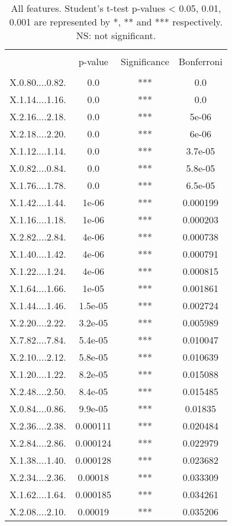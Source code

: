 \documentclass[]{article}
\begin{document}
    \begin{longtable}{ c c c c }
    \caption{All features. Student's t-test p-values < 0.05, 0.01, 0.001 are represented by *, ** and 
    *** respectively. NS: not significant.} \label{tab:long} \\
    \hline \\
        & p-value & Significance & Bonferroni \\
    \hline \\
    \endfirsthead
    \endhead
    X.0.80....0.82. & 0.0 & *** & 0.0\\
X.1.14....1.16. & 0.0 & *** & 0.0\\
X.2.16....2.18. & 0.0 & *** & 5e-06\\
X.2.18....2.20. & 0.0 & *** & 6e-06\\
X.1.12....1.14. & 0.0 & *** & 3.7e-05\\
X.0.82....0.84. & 0.0 & *** & 5.8e-05\\
X.1.76....1.78. & 0.0 & *** & 6.5e-05\\
X.1.42....1.44. & 1e-06 & *** & 0.000199\\
X.1.16....1.18. & 1e-06 & *** & 0.000203\\
X.2.82....2.84. & 4e-06 & *** & 0.000738\\
X.1.40....1.42. & 4e-06 & *** & 0.000791\\
X.1.22....1.24. & 4e-06 & *** & 0.000815\\
X.1.64....1.66. & 1e-05 & *** & 0.001861\\
X.1.44....1.46. & 1.5e-05 & *** & 0.002724\\
X.2.20....2.22. & 3.2e-05 & *** & 0.005989\\
X.7.82....7.84. & 5.4e-05 & *** & 0.010047\\
X.2.10....2.12. & 5.8e-05 & *** & 0.010639\\
X.1.20....1.22. & 8.2e-05 & *** & 0.015088\\
X.2.48....2.50. & 8.4e-05 & *** & 0.015485\\
X.0.84....0.86. & 9.9e-05 & *** & 0.01835\\
X.2.36....2.38. & 0.000111 & *** & 0.020484\\
X.2.84....2.86. & 0.000124 & *** & 0.022979\\
X.1.38....1.40. & 0.000128 & *** & 0.023682\\
X.2.34....2.36. & 0.00018 & *** & 0.033309\\
X.1.62....1.64. & 0.000185 & *** & 0.034261\\
X.2.08....2.10. & 0.00019 & *** & 0.035206\\

\end{longtable}
\end{document}
